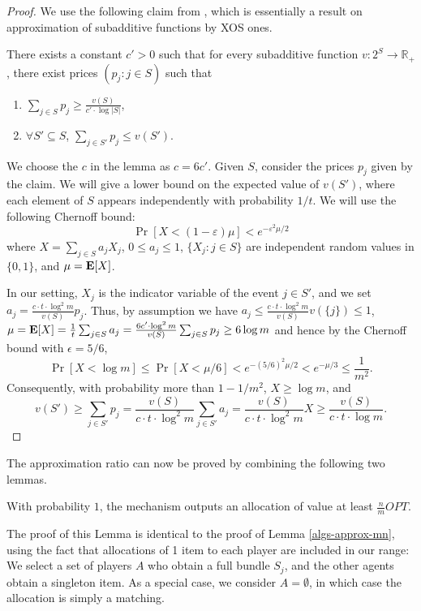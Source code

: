 \documentclass{article}
\newcommand{\eps}{\varepsilon}
\newcommand{\R}{\mathbb{R}}
\newcommand{\E}{\mbox{\bf E}}
\begin{document}
\begin{proof}
We use the following claim from \cite{D07}, which is essentially a result on approximation of subadditive functions by XOS ones.

\begin{claim*}[\cite{D07}]\label{claim-xos-approx}
There exists a constant $c'>0$ such that for every subadditive function $v:2^S \to \R_+$, there exist prices $(p_j: j \in S)$ such that
\begin{enumerate}
\item $\sum_{j \in S} p_j \geq \frac{v(S)}{c'\cdot \log |S|}$,
\item $\forall S' \subseteq S$,  $\sum_{j \in S'} p_j \leq v(S')$.
\end{enumerate}
\end{claim*}

We choose the $c$ in the lemma as $c = 6c'$. Given $S$, consider the prices $p_j$ given by the claim. 
We will give a lower bound on the expected value of $v(S')$, where each element of $S$ appears independently with probability $1/t$. We will use the following Chernoff bound:
$$
\Pr[X<(1-\eps)\mu] < e^{-\eps^2 \mu / 2}
$$
where $X = \sum_{j \in S} a_j X_j$, $0 \leq a_j \leq 1$, $\{X_j: j \in S\}$ are independent random values in $\{0,1\}$, and $\mu=\E[X]$. 

In our setting, $X_j$ is the indicator variable of the event $j \in S'$, and we set $a_j =  \frac{c \cdot t \cdot \log^2 m} {v(S)}  p_j$. Thus, by assumption we have
$a_j \leq  \frac{c \cdot t \cdot \log^2 m} {v(S)}  v(\{j\}) \leq 1$, $\mu = \E[X] = \frac{1}{t} \sum_{j \in S} a_j = \frac{6c' \cdot \log^2 m} {v(S)}  \sum_{j \in S} p_j \geq 6 \log m$ and hence by the Chernoff bound with $\epsilon=5/6$,
$$
\Pr[X < \log m] \leq \Pr[X<\mu/6] < e^{-(5/6)^2 \mu / 2} < e^{-\mu/3} \leq \frac{1}{m^2}.
$$
Consequently, with probability more than $1-1/m^2$, $X \geq \log m$, and
$$
v(S') \geq \sum_{j \in S'} p_j = \frac{v(S)}{c \cdot t \cdot \log^2 m} \sum_{j \in S'} a_j
 = \frac{v(S)}{c \cdot t \cdot \log^2 m} X \geq \frac{v(S)}{c \cdot t \cdot \log m}.
$$
\end{proof}

The approximation ratio can now be proved by combining the following two lemmas.

\begin{lemma}
With probability $1$, the mechanism outputs an allocation of value at least $\frac{n}{m} OPT$.
\end{lemma}

The proof of this Lemma is identical to the proof of Lemma \ref{algs-approx-mn}, using the fact that allocations of 1 item to each player are included in our range:
We select a set of players $A$ who obtain a full bundle $S_j$, and the other agents obtain a singleton item. As a special case, we consider $A = \emptyset$, in which case the allocation is simply a matching.
\end{document}
